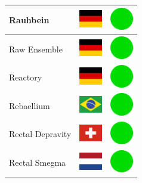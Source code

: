\documentclass[12pt, a4paper, twoside]{report}
\begin{document}
\begin{center}
\begin{longtable}{|p{5cm}|p{2cm}|p{2cm}|}
 Rauhbein                                                   & \includegraphics[width=1cm]{../4x3/de} &   \includegraphics[width=1cm]{../likes/y} \\ \hline
 Raw Ensemble                                               & \includegraphics[width=1cm]{../4x3/de} &   \includegraphics[width=1cm]{../likes/y} \\ \hline
 Reactory                                                   & \includegraphics[width=1cm]{../4x3/de} &   \includegraphics[width=1cm]{../likes/y} \\ \hline
 Rebaellium                                                 & \includegraphics[width=1cm]{../4x3/br} &   \includegraphics[width=1cm]{../likes/y} \\ \hline
 Rectal Depravity                                           & \includegraphics[width=1cm]{../4x3/ch} &   \includegraphics[width=1cm]{../likes/y} \\ \hline
 Rectal Smegma                                              & \includegraphics[width=1cm]{../4x3/nl} &   \includegraphics[width=1cm]{../likes/y} \\ \hline

\end{longtable}
\end{center}
\end{document}
